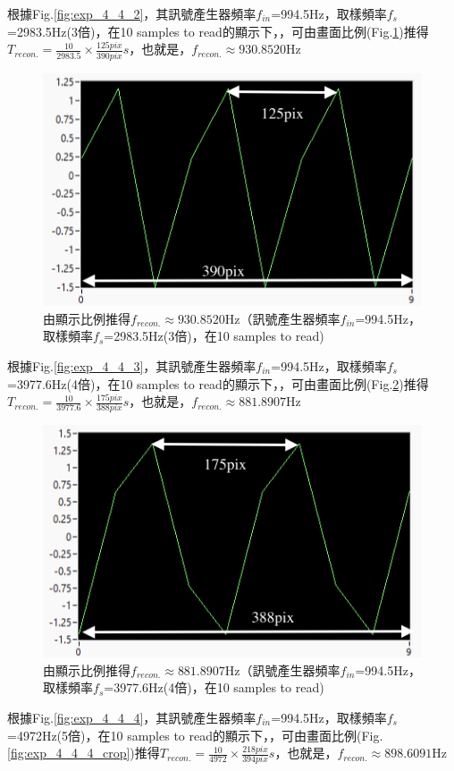 \documentclass[12pt,a4paper]{article}
\begin{document}
\begin{CJK}{UTF8}{bkai}
\begin{enumerate}
\clearpage
根據Fig.\ref{fig:exp_4_4_2}，其訊號產生器頻率$f_{in}$=994.5Hz，取樣頻率$f_{s}$=2983.5Hz(3倍)，在10 samples to read的顯示下，，可由畫面比例(Fig.\ref{fig:exp_4_4_2_crop})推得$T_{recon.}=\frac{10}{2983.5}\times\frac{125pix}{390pix}s$，也就是，$f_{recon.}\approx930.8520$Hz

\begin{figure}[h]
    \centering
    \includegraphics[width=0.6\linewidth]{figures/exp_4_4_2_crop.png}
    \caption{由顯示比例推得$f_{recon.}\approx930.8520$Hz（訊號產生器頻率$f_{in}$=994.5Hz，取樣頻率$f_{s}$=2983.5Hz(3倍)，在10 samples to read)}
    \label{fig:exp_4_4_2_crop}
\end{figure}



根據Fig.\ref{fig:exp_4_4_3}，其訊號產生器頻率$f_{in}$=994.5Hz，取樣頻率$f_{s}$=3977.6Hz(4倍)，在10 samples to read的顯示下，，可由畫面比例(Fig.\ref{fig:exp_4_4_3_crop})推得$T_{recon.}=\frac{10}{3977.6}\times\frac{175pix}{388pix}s$，也就是，$f_{recon.}\approx881.8907$Hz

\begin{figure}[h]
    \centering
    \includegraphics[width=0.6\linewidth]{figures/exp_4_4_3_crop.png}
    \caption{由顯示比例推得$f_{recon.}\approx881.8907$Hz（訊號產生器頻率$f_{in}$=994.5Hz，取樣頻率$f_{s}$=3977.6Hz(4倍)，在10 samples to read)}
    \label{fig:exp_4_4_3_crop}
\end{figure}

\clearpage
根據Fig.\ref{fig:exp_4_4_4}，其訊號產生器頻率$f_{in}$=994.5Hz，取樣頻率$f_{s}$=4972Hz(5倍)，在10 samples to read的顯示下，，可由畫面比例(Fig.\ref{fig:exp_4_4_4_crop})推得$T_{recon.}=\frac{10}{4972}\times\frac{218pix}{394pix}s$，也就是，$f_{recon.}\approx898.6091$Hz


\end{enumerate}
\end{CJK}
\end{document}
